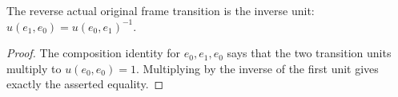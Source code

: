 \begin{corollary}\label{cor:fc-original-frame-transition-unit-inverse}
\leanok
{}
The reverse actual original frame transition is the inverse unit:
$u(e_1,e_0)=u(e_0,e_1)^{-1}$.
\end{corollary}
\begin{proof}
The composition identity for $e_0,e_1,e_0$ says that the two
transition units multiply to $u(e_0,e_0)=1$. Multiplying by the
inverse of the first unit gives exactly the asserted equality.
\end{proof}
